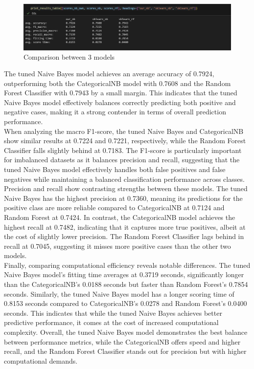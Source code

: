 \begin{figure}[hbt!]
    \centering
    \includegraphics[width=1\linewidth]{Images/6.8c.jpg}
    \caption{Comparison between 3 models}
    \label{fig:enter-label}
\end{figure}

The tuned Naive Bayes model achieves an average accuracy of 0.7924, outperforming both the CategoricalNB model with 0.7608 and the Random Forest Classifier with 0.7943 by a small margin. This indicates that the tuned Naive Bayes model effectively balances correctly predicting both positive and negative cases, making it a strong contender in terms of overall prediction performance.\\

When analyzing the macro F1-score, the tuned Naive Bayes and CategoricalNB show similar results at 0.7224 and 0.7221, respectively, while the Random Forest Classifier falls slightly behind at 0.7183. The F1-score is particularly important for imbalanced datasets as it balances precision and recall, suggesting that the tuned Naive Bayes model effectively handles both false positives and false negatives while maintaining a balanced classification performance across classes.\\

Precision and recall show contrasting strengths between these models. The tuned Naive Bayes has the highest precision at 0.7360, meaning its predictions for the positive class are more reliable compared to CategoricalNB at 0.7124 and Random Forest at 0.7424. In contrast, the CategoricalNB model achieves the highest recall at 0.7482, indicating that it captures more true positives, albeit at the cost of slightly lower precision. The Random Forest Classifier lags behind in recall at 0.7045, suggesting it misses more positive cases than the other two models.\\

Finally, comparing computational efficiency reveals notable differences. The tuned Naive Bayes model's fitting time averages at 0.3719 seconds, significantly longer than the CategoricalNB's 0.0188 seconds but faster than Random Forest's 0.7854 seconds. Similarly, the tuned Naive Bayes model has a longer scoring time of 0.8153 seconds compared to CategoricalNB's 0.0278 and Random Forest's 0.0400 seconds. This indicates that while the tuned Naive Bayes achieves better predictive performance, it comes at the cost of increased computational complexity. Overall, the tuned Naive Bayes model demonstrates the best balance between performance metrics, while the CategoricalNB offers speed and higher recall, and the Random Forest Classifier stands out for precision but with higher computational demands.\\












